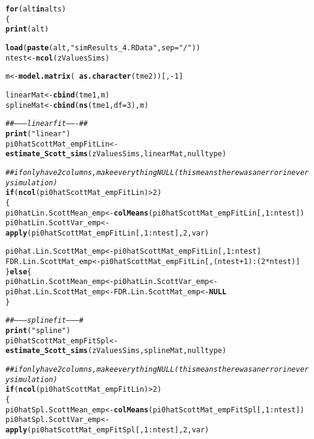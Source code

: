 \documentclass{article}\usepackage[]{graphicx}\usepackage[]{color}
\makeatletter
\newcommand{\hlnum}[1]{\textcolor[rgb]{0.686,0.059,0.569}{#1}}%
\newcommand{\hlstr}[1]{\textcolor[rgb]{0.192,0.494,0.8}{#1}}%
\newcommand{\hlcom}[1]{\textcolor[rgb]{0.678,0.584,0.686}{\textit{#1}}}%
\newcommand{\hlopt}[1]{\textcolor[rgb]{0,0,0}{#1}}%
\newcommand{\hlstd}[1]{\textcolor[rgb]{0.345,0.345,0.345}{#1}}%
\newcommand{\hlkwa}[1]{\textcolor[rgb]{0.161,0.373,0.58}{\textbf{#1}}}%
\newcommand{\hlkwb}[1]{\textcolor[rgb]{0.69,0.353,0.396}{#1}}%
\newcommand{\hlkwc}[1]{\textcolor[rgb]{0.333,0.667,0.333}{#1}}%
\newcommand{\hlkwd}[1]{\textcolor[rgb]{0.737,0.353,0.396}{\textbf{#1}}}%
\newenvironment{kframe}{%
 \def\at@end@of@kframe{}%
 \ifinner\ifhmode%
  \def\at@end@of@kframe{\end{minipage}}%
  \begin{minipage}{\columnwidth}%
 \fi\fi%
 \def\FrameCommand##1{\hskip\@totalleftmargin \hskip-\fboxsep
 \colorbox{shadecolor}{##1}\hskip-\fboxsep
     \hskip-\linewidth \hskip-\@totalleftmargin \hskip\columnwidth}%
 \MakeFramed {\advance\hsize-\width
   \@totalleftmargin\z@ \linewidth\hsize
   \@setminipage}}%
 {\par\unskip\endMakeFramed%
 \at@end@of@kframe}
\newenvironment{knitrout}{}{} %
\makeatother
\begin{document}
\begin{knitrout}
\color{fgcolor}\begin{kframe}
\begin{alltt}
\hlkwa{for}\hlstd{(alt} \hlkwa{in} \hlstd{alts)}
\hlstd{\{}
  \hlkwd{print}\hlstd{(alt)}

  \hlkwd{load}\hlstd{(}\hlkwd{paste}\hlstd{(alt,}\hlstr{"simResults_4.RData"}\hlstd{,}\hlkwc{sep}\hlstd{=}\hlstr{"/"}\hlstd{))}
  \hlstd{ntest} \hlkwb{<-} \hlkwd{ncol}\hlstd{(zValuesSims)}

  \hlstd{m} \hlkwb{<-} \hlkwd{model.matrix}\hlstd{(}\hlopt{~}\hlkwd{as.character}\hlstd{(tme2))[,}\hlopt{-}\hlnum{1}\hlstd{]}

  \hlstd{linearMat} \hlkwb{<-} \hlkwd{cbind}\hlstd{(tme1, m)}
  \hlstd{splineMat} \hlkwb{<-} \hlkwd{cbind}\hlstd{(}\hlkwd{ns}\hlstd{(tme1,}\hlkwc{df}\hlstd{=}\hlnum{3}\hlstd{), m)}

  \hlcom{##--------linear fit-------##}
  \hlkwd{print}\hlstd{(}\hlstr{"linear"}\hlstd{)}
  \hlstd{pi0hatScottMat_empFitLin} \hlkwb{<-} \hlkwd{estimate_Scott_sims}\hlstd{(zValuesSims, linearMat, nulltype)}

  \hlcom{##if only have 2 columns, make everything NULL (this means there was an error in every simulation)}
  \hlkwa{if}\hlstd{(}\hlkwd{ncol}\hlstd{(pi0hatScottMat_empFitLin)} \hlopt{>} \hlnum{2}\hlstd{)}
  \hlstd{\{}
    \hlstd{pi0hatLin.ScottMean_emp} \hlkwb{<-} \hlkwd{colMeans}\hlstd{(pi0hatScottMat_empFitLin[,}\hlnum{1}\hlopt{:}\hlstd{ntest])}
    \hlstd{pi0hatLin.ScottVar_emp} \hlkwb{<-} \hlkwd{apply}\hlstd{(pi0hatScottMat_empFitLin[,}\hlnum{1}\hlopt{:}\hlstd{ntest],}\hlnum{2}\hlstd{,var)}

    \hlstd{pi0hat.Lin.ScottMat_emp} \hlkwb{<-} \hlstd{pi0hatScottMat_empFitLin[,}\hlnum{1}\hlopt{:}\hlstd{ntest]}
    \hlstd{FDR.Lin.ScottMat_emp} \hlkwb{<-} \hlstd{pi0hatScottMat_empFitLin[,(ntest}\hlopt{+}\hlnum{1}\hlstd{)}\hlopt{:}\hlstd{(}\hlnum{2}\hlopt{*}\hlstd{ntest)]}
  \hlstd{\}} \hlkwa{else} \hlstd{\{}
    \hlstd{pi0hatLin.ScottMean_emp} \hlkwb{<-} \hlstd{pi0hatLin.ScottVar_emp} \hlkwb{<-}
      \hlstd{pi0hat.Lin.ScottMat_emp} \hlkwb{<-} \hlstd{FDR.Lin.ScottMat_emp} \hlkwb{<-} \hlkwa{NULL}
  \hlstd{\}}

  \hlcom{##---------spline fit---------#}
  \hlkwd{print}\hlstd{(}\hlstr{"spline"}\hlstd{)}
  \hlstd{pi0hatScottMat_empFitSpl} \hlkwb{<-} \hlkwd{estimate_Scott_sims}\hlstd{(zValuesSims, splineMat, nulltype)}

  \hlcom{##if only have 2 columns, make everything NULL (this means there was an error in every simulation)}
  \hlkwa{if}\hlstd{(}\hlkwd{ncol}\hlstd{(pi0hatScottMat_empFitLin)} \hlopt{>} \hlnum{2}\hlstd{)}
  \hlstd{\{}
    \hlstd{pi0hatSpl.ScottMean_emp} \hlkwb{<-} \hlkwd{colMeans}\hlstd{(pi0hatScottMat_empFitSpl[,}\hlnum{1}\hlopt{:}\hlstd{ntest])}
    \hlstd{pi0hatSpl.ScottVar_emp} \hlkwb{<-} \hlkwd{apply}\hlstd{(pi0hatScottMat_empFitSpl[,}\hlnum{1}\hlopt{:}\hlstd{ntest],}\hlnum{2}\hlstd{,var)}


\end{alltt}
\end{kframe}
\end{knitrout}
\end{document}
